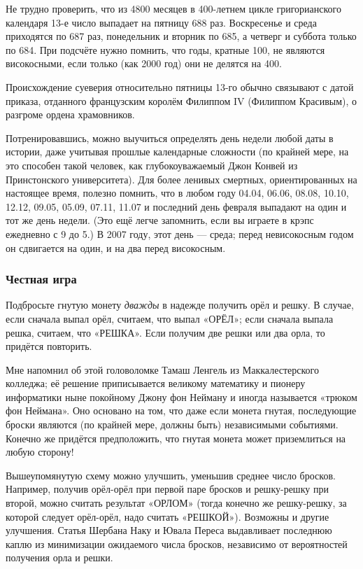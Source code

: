 Не трудно проверить, что из 4800 месяцев в 400-летнем цикле григорианского календаря 13-е число выпадает на пятницу 688 раз.
Воскресенье и среда приходятся по 687 раз, понедельник и вторник по 685, а четверг и суббота только по 684.
При подсчёте нужно помнить, что годы, кратные 100, не являются високосными, если только (как 2000 год) они не делятся на 400.

Происхождение суеверия относительно пятницы 13-го обычно связывают с датой приказа, отданного французским королём Филиппом IV (Филиппом Красивым), о разгроме ордена храмовников.

Потренировавшись, можно выучиться определять день недели любой даты в истории, даже учитывая прошлые календарные сложности
(по крайней мере, на это способен такой человек, как глубокоуважаемый Джон Конвей из Принстонского университета).
Для более ленивых смертных, ориентированных на настоящее время, полезно помнить, что в любом году
04.04, 06.06, 08.08, 10.10, 12.12, 09.05, 05.09, 07.11, 11.07 и последний день февраля выпадают на один и тот же день недели.
(Это ещё легче запомнить, если вы играете в крэпс ежедневно с 9 до 5.)
В 2007 году, этот день --- среда;
перед невисокосным годом он сдвигается на один, и на два перед високосным.

\subsubsection*{Честная игра}

Подбросьте гнутую монету \emph{дважды} в надежде получить орёл и решку.
В случае, если сначала выпал орёл, считаем, что выпал «ОРЁЛ»;
если сначала выпала решка, считаем, что «РЕШКА».
Если получим две решки или два орла, то придётся повторить.

Мне напомнил об этой головоломке Тамаш Ленгель из Маккалестерского колледжа;
её решение приписывается великому математику и пионеру информатики ныне покойному Джону фон Нейману и иногда называется «трюком фон Неймана».
Оно основано на том, что даже если монета гнутая, последующие броски являются (по крайней мере, должны быть) независимыми событиями.
Конечно же придётся предположить, что гнутая монета может приземлиться на любую сторону!

Вышеупомянутую схему можно улучшить, уменьшив среднее число бросков.
Например, получив орёл-орёл при первой паре бросков и решку-решку при второй, можно считать результат «ОРЛОМ» (тогда конечно же решку-решку, за которой следует орёл-орёл, надо считать «РЕШКОЙ»).
Возможны и другие улучшения.
Статья Шербана Наку и Ювала Переса \cite{44} выдавливает последнюю каплю из минимизации ожидаемого числа бросков, независимо от вероятностей получения орла и решки.

